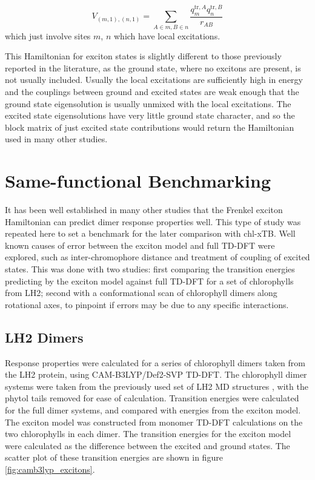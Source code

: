 \begin{equation}
    V_{\left(m, 1\right), \left(n,1\right)} = \sum_{A \in m, B \in n} \frac{q^{\text{tr},A}_m q^{\text{tr},B}_n}{r_{AB}}
    \label{eq:exciton_coupling}
\end{equation}
%
which just involve sites $m$, $n$ which have local excitations.

This Hamiltonian for exciton states is slightly different to those previously reported 
in the literature, as the ground state, where no excitons are present, is not usually
included. Usually the local excitations are sufficiently high in energy and the
couplings between ground and excited states are weak enough that the ground state 
eigensolution is usually unmixed with the local excitations. The excited state eigensolutions
have very little ground state character, and so the block matrix of just excited
state contributions would return the Hamiltonian used in many other studies.

\section{Same-functional Benchmarking}
\label{sec:exction_v_full_dimer}

It has been well established in many other studies that the Frenkel exciton Hamiltonian
can predict dimer response properties well. This type of study was repeated here
to set a benchmark for the later comparison with chl-xTB. Well known causes of error
between the exciton model and full TD-DFT were explored, such as inter-chromophore
distance and treatment of coupling of excited states. This was done with two studies:
first comparing the transition energies predicting by the exciton model against 
full TD-DFT for a set of chlorophylls from LH2; second with a conformational scan
of chlorophyll dimers along rotational axes, to pinpoint if errors may be due to
any specific interactions.

\subsection{LH2 Dimers}
\label{subsec:LH2_exciton_camb3lyp}

Response properties were calculated for a series of chlorophyll dimers taken from
the LH2 protein, using CAM-B3LYP/Def2-SVP TD-DFT. The chlorophyll dimer systems
were taken from the previously used set of LH2 MD structures \cite{Stross2016},
with the phytol tails removed for ease of calculation. Transition energies were
calculated for the full dimer systems, and compared with energies from the exciton 
model. The exciton model was constructed from monomer TD-DFT calculations on the
two chlorophylls in each dimer. The transition energies for the exciton model were
calculated as the difference between the excited and ground states. The scatter
plot of these transition energies are shown in figure \ref{fig:camb3lyp_excitons}. 

